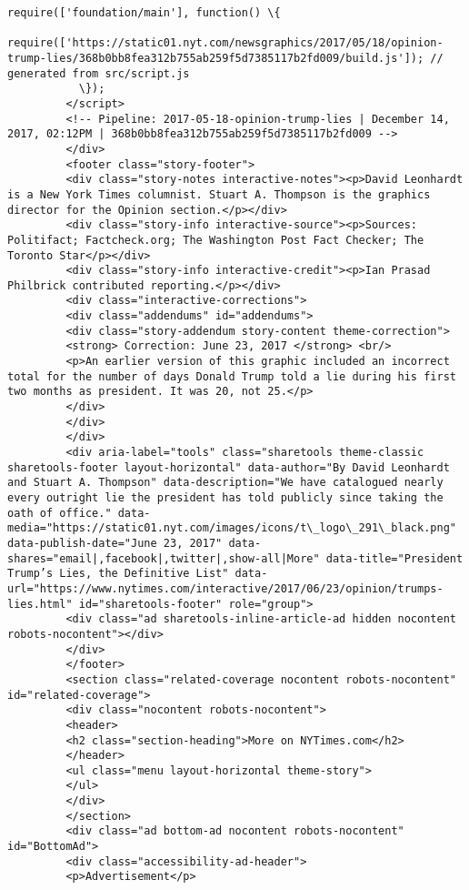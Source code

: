 \documentclass[11pt]{article}
\begin{document}
\begin{Verbatim}[commandchars=\\\{\}]
           require(['foundation/main'], function() \{
             require(['https://static01.nyt.com/newsgraphics/2017/05/18/opinion-trump-lies/368b0bb8fea312b755ab259f5d7385117b2fd009/build.js']); // generated from src/script.js
           \});
         </script>
         <!-- Pipeline: 2017-05-18-opinion-trump-lies | December 14, 2017, 02:12PM | 368b0bb8fea312b755ab259f5d7385117b2fd009 -->
         </div>
         <footer class="story-footer">
         <div class="story-notes interactive-notes"><p>David Leonhardt is a New York Times columnist. Stuart A. Thompson is the graphics director for the Opinion section.</p></div>
         <div class="story-info interactive-source"><p>Sources: Politifact; Factcheck.org; The Washington Post Fact Checker; The Toronto Star</p></div>
         <div class="story-info interactive-credit"><p>Ian Prasad Philbrick contributed reporting.</p></div>
         <div class="interactive-corrections">
         <div class="addendums" id="addendums">
         <div class="story-addendum story-content theme-correction">
         <strong> Correction: June 23, 2017 </strong> <br/>
         <p>An earlier version of this graphic included an incorrect total for the number of days Donald Trump told a lie during his first two months as president. It was 20, not 25.</p>
         </div>
         </div>
         </div>
         <div aria-label="tools" class="sharetools theme-classic sharetools-footer layout-horizontal" data-author="By David Leonhardt and Stuart A. Thompson" data-description="We have catalogued nearly every outright lie the president has told publicly since taking the oath of office." data-media="https://static01.nyt.com/images/icons/t\_logo\_291\_black.png" data-publish-date="June 23, 2017" data-shares="email|,facebook|,twitter|,show-all|More" data-title="President Trump’s Lies, the Definitive List" data-url="https://www.nytimes.com/interactive/2017/06/23/opinion/trumps-lies.html" id="sharetools-footer" role="group">
         <div class="ad sharetools-inline-article-ad hidden nocontent robots-nocontent"></div>
         </div>
         </footer>
         <section class="related-coverage nocontent robots-nocontent" id="related-coverage">
         <div class="nocontent robots-nocontent">
         <header>
         <h2 class="section-heading">More on NYTimes.com</h2>
         </header>
         <ul class="menu layout-horizontal theme-story">
         </ul>
         </div>
         </section>
         <div class="ad bottom-ad nocontent robots-nocontent" id="BottomAd">
         <div class="accessibility-ad-header">
         <p>Advertisement</p>

\end{Verbatim}
\end{document}
